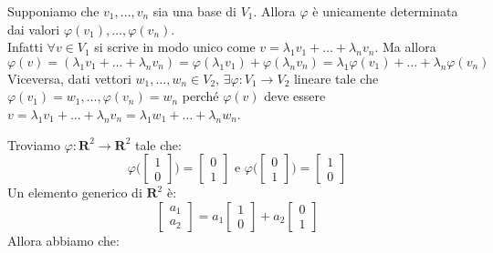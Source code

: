 \begin{observation}
	Supponiamo che $v_1, \hdots, v_n$ sia una base di $V_1$. Allora $\varphi$ è unicamente determinata dai valori $\varphi(v_1), \hdots, \varphi(v_n)$. \\
	Infatti $\forall v \in V_1 $ si scrive in modo unico come $v=\lambda_1v_1 + \hdots + \lambda_n v_n$. Ma allora
	\begin{equation*}
		\varphi(v)  = (\lambda_1v_1 + \hdots + \lambda_n v_n) = \varphi(\lambda_{1}v_1) + \varphi(\lambda_nv_n) = \lambda_1\varphi(v_1) + \hdots + \lambda_n\varphi(v_n)
	\end{equation*}
	Viceversa, dati vettori $w_1, \hdots, w_n \in V_2$, $\exists \varphi: V_1 \rightarrow V_2$ lineare tale che $\varphi(v_1)=w_1, \hdots, \varphi(v_n) = w_n$ perché $\varphi(v)$ deve essere $v=\lambda_1v_1 + \hdots + \lambda_n v_n = \lambda_{1}w_1 + \hdots + \lambda_nw_n$.
\end{observation}
\begin{example}
	Troviamo $\varphi:\mathbf{R}^2\rightarrow\mathbf{R}^2$ tale che:
	\begin{equation*}
		\varphi \bigg(
		\begin{bmatrix}
			1 \\ 0
		\end{bmatrix}
		\bigg) = 
		\begin{bmatrix}
			0 \\ 1
		\end{bmatrix}
		\text{ e }
		\varphi \bigg(
		\begin{bmatrix}
			0 \\ 1
		\end{bmatrix}
		\bigg) = 
		\begin{bmatrix}
			1 \\ 0
		\end{bmatrix}
	\end{equation*}
	Un elemento generico di $\mathbf{R}^2$ è:
	\begin{equation*}
		\begin{bmatrix}
			a_1 \\ a_2
		\end{bmatrix}
		= a_1
		\begin{bmatrix}
			1 \\ 0
		\end{bmatrix}
		+ a_2
		\begin{bmatrix}
			0 \\ 1
		\end{bmatrix}
	\end{equation*}
	Allora abbiamo che:
	
\end{example}
